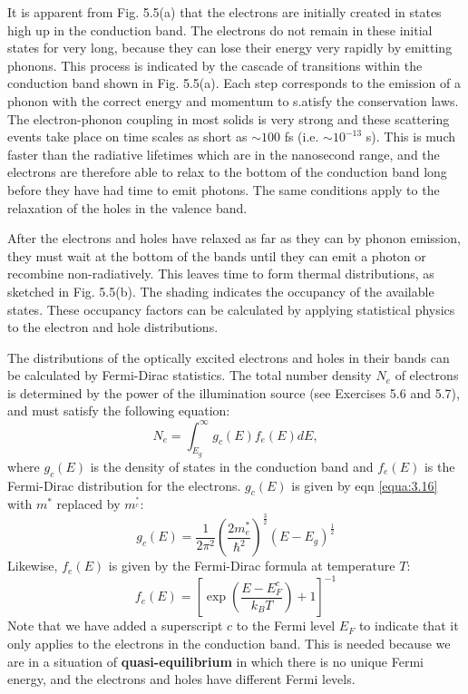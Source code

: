 \documentclass[12pt]{book}
\begin{document}
It is apparent from Fig. 5.5(a) that the electrons are initially created in states high up in the conduction band. The electrons do not remain in these initial states for very long, because they can lose their energy very rapidly by emitting phonons. This process is indicated by the cascade of transitions within the conduction band shown in Fig. 5.5(a). Each step corresponds to the emission of a phonon with the correct energy and momentum to s.atisfy the conservation laws. The electron-phonon coupling in most solids is very strong and these scattering events take place on time scales as short as $\sim 100$ fs (i.e. $\sim 10^{-13}$ s). This is much faster than the radiative lifetimes which are in the nanosecond range, and the electrons are therefore able to relax to the bottom of the conduction band long before they have had time to emit photons. The same conditions apply to the relaxation of the holes in the valence band.

After the electrons and holes have relaxed as far as they can by phonon emission, they must wait at the bottom of the bands until they can emit a photon or recombine non-radiatively. This leaves time to form thermal distributions, as sketched in Fig. 5.5(b). The shading indicates the occupancy of the available states. These occupancy factors can be calculated by applying statistical physics to the electron and hole distributions.

The distributions of the optically excited electrons and holes in their bands can be calculated by Fermi-Dirac statistics. The total number density $N_e$ of electrons is determined by the power of the illumination source (see Exercises 5.6 and 5.7), and must satisfy the following equation:
\begin{equation}\label{equa:5.6}
  N_e=\int_{E_g}^{\infty}g_c(E)f_e(E)dE,
\end{equation}
where $g_c(E)$ is the density of states in the conduction band and $f_e(E)$ is the Fermi-Dirac distribution for the electrons. $g_c(E)$ is given by eqn \ref{equa:3.16} with $m^*$ replaced by $m^_c^*$:
\begin{equation}\label{equa:5.7}
  g_c(E)=\frac{1}{2\pi^2}(\frac{2m_e^*}{\hbar^2})^{\frac{3}{2}}(E-E_g)^{\frac{1}{2}}
\end{equation}
Likewise, $f_e(E)$ is given by the Fermi-Dirac formula at temperature $T$:
\begin{equation}\label{equa:5.8}
  f_e(E)=[\exp(\frac{E-E_F^c}{k_BT})+1]^{-1}
\end{equation}
Note that we have added a superscript $c$ to the Fermi level $E_F$ to indicate that it only applies to the electrons in the conduction band. This is needed because we are in a situation of \textbf{quasi-equilibrium} in which there is no unique Fermi energy, and the electrons and holes have different Fermi levels.
\end{document}
